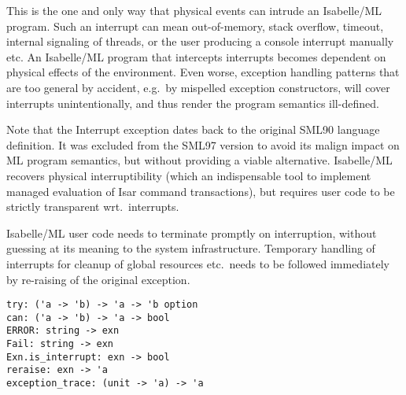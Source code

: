 \begin{isabellebody}
\begin{isamarkuptext}
  This is the one and only way that physical events can intrude an
  Isabelle/ML program.  Such an interrupt can mean out-of-memory,
  stack overflow, timeout, internal signaling of threads, or the user
  producing a console interrupt manually etc.  An Isabelle/ML program
  that intercepts interrupts becomes dependent on physical effects of
  the environment.  Even worse, exception handling patterns that are
  too general by accident, e.g.\ by mispelled exception constructors,
  will cover interrupts unintentionally, and thus render the program
  semantics ill-defined.

  Note that the Interrupt exception dates back to the original SML90
  language definition.  It was excluded from the SML97 version to
  avoid its malign impact on ML program semantics, but without
  providing a viable alternative.  Isabelle/ML recovers physical
  interruptibility (which an indispensable tool to implement managed
  evaluation of Isar command transactions), but requires user code to
  be strictly transparent wrt.\ interrupts.

  \begin{warn}
  Isabelle/ML user code needs to terminate promptly on interruption,
  without guessing at its meaning to the system infrastructure.
  Temporary handling of interrupts for cleanup of global resources
  etc.\ needs to be followed immediately by re-raising of the original
  exception.
  \end{warn}%
\end{isamarkuptext}%
\isamarkuptrue%
%
\isadelimmlref
%
\endisadelimmlref
%
\isatagmlref
%
\begin{isamarkuptext}%
\begin{mldecls}
  \verb|try: ('a -> 'b) -> 'a -> 'b option| \\
  \verb|can: ('a -> 'b) -> 'a -> bool| \\
  \verb|ERROR: string -> exn| \\
  \verb|Fail: string -> exn| \\
  \verb|Exn.is_interrupt: exn -> bool| \\
  \verb|reraise: exn -> 'a| \\
  \verb|exception_trace: (unit -> 'a) -> 'a| \\
  \end{mldecls}

  \begin{description}


\end{description}
\end{isamarkuptext}
\end{isabellebody}
